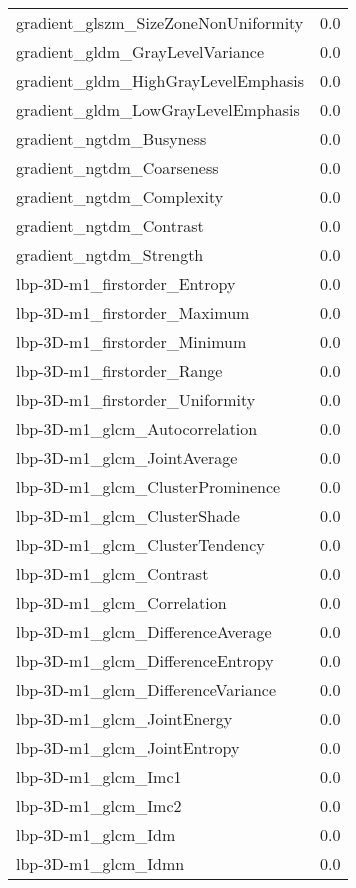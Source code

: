 {\begin{xltabular}[H]{\textwidth}{X r}
        gradient\_glszm\_SizeZoneNonUniformity & 0.0 \\
        gradient\_gldm\_GrayLevelVariance & 0.0 \\
        gradient\_gldm\_HighGrayLevelEmphasis & 0.0 \\
        gradient\_gldm\_LowGrayLevelEmphasis & 0.0 \\
        gradient\_ngtdm\_Busyness & 0.0 \\
        gradient\_ngtdm\_Coarseness & 0.0 \\
        gradient\_ngtdm\_Complexity & 0.0 \\
        gradient\_ngtdm\_Contrast & 0.0 \\
        gradient\_ngtdm\_Strength & 0.0 \\
        lbp-3D-m1\_firstorder\_Entropy & 0.0 \\
        lbp-3D-m1\_firstorder\_Maximum & 0.0 \\
        lbp-3D-m1\_firstorder\_Minimum & 0.0 \\
        lbp-3D-m1\_firstorder\_Range & 0.0 \\
        lbp-3D-m1\_firstorder\_Uniformity & 0.0 \\
        lbp-3D-m1\_glcm\_Autocorrelation & 0.0 \\
        lbp-3D-m1\_glcm\_JointAverage & 0.0 \\
        lbp-3D-m1\_glcm\_ClusterProminence & 0.0 \\
        lbp-3D-m1\_glcm\_ClusterShade & 0.0 \\
        lbp-3D-m1\_glcm\_ClusterTendency & 0.0 \\
        lbp-3D-m1\_glcm\_Contrast & 0.0 \\
        lbp-3D-m1\_glcm\_Correlation & 0.0 \\
        lbp-3D-m1\_glcm\_DifferenceAverage & 0.0 \\
        lbp-3D-m1\_glcm\_DifferenceEntropy & 0.0 \\
        lbp-3D-m1\_glcm\_DifferenceVariance & 0.0 \\
        lbp-3D-m1\_glcm\_JointEnergy & 0.0 \\
        lbp-3D-m1\_glcm\_JointEntropy & 0.0 \\
        lbp-3D-m1\_glcm\_Imc1 & 0.0 \\
        lbp-3D-m1\_glcm\_Imc2 & 0.0 \\
        lbp-3D-m1\_glcm\_Idm & 0.0 \\
        lbp-3D-m1\_glcm\_Idmn & 0.0 \\

\end{xltabular}}
